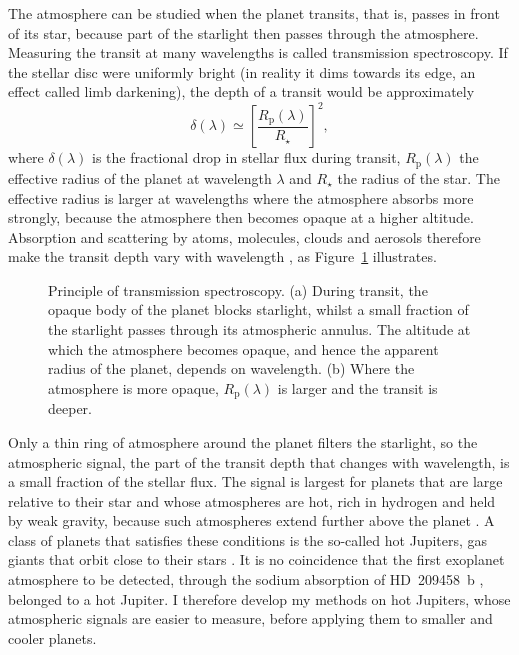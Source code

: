 The atmosphere can be studied when the planet transits, that is, passes in front of its star, because part of the starlight then passes through the atmosphere. Measuring the transit at many wavelengths is called
transmission spectroscopy. If the stellar disc were uniformly bright (in reality it dims towards its edge, an effect called limb darkening), the depth of a transit would be approximately
\begin{equation}
  \delta(\lambda) \simeq
  \left[\frac{R_{\mathrm p}(\lambda)}{R_\star}\right]^2 ,
  \label{eq:transit-depth}
\end{equation}
where $\delta(\lambda)$ is the fractional drop in stellar flux during transit,
$R_{\mathrm p}(\lambda)$ the effective radius of the planet at wavelength
$\lambda$ and $R_\star$ the radius of the star. The effective radius is larger
at wavelengths where the atmosphere absorbs more strongly, because the
atmosphere then becomes opaque at a higher altitude. Absorption and scattering by atoms, molecules, clouds and aerosols therefore make the transit depth vary with
wavelength \citep{SeagerSasselov2000,Brown2001}, as
Figure~\ref{fig:transmission-spectroscopy} illustrates.

\begin{figure}[t]
  \centering
  
  \caption{Principle of transmission spectroscopy. (a) During transit, the
  opaque body of the planet blocks starlight, whilst a small fraction of the
  starlight passes through its atmospheric annulus. The altitude at which
  the atmosphere becomes opaque, and hence the apparent radius of the
  planet, depends on wavelength. (b) Where the atmosphere is more opaque,
  $R_{\mathrm p}(\lambda)$ is larger and the transit is deeper.}
  \label{fig:transmission-spectroscopy}
\end{figure}

Only a thin ring of atmosphere around the planet filters the starlight, so the atmospheric signal, the part of the transit depth that changes with wavelength, is a small fraction of the stellar flux. The signal is
largest for planets that are large relative to their star and whose
atmospheres are hot, rich in hydrogen and held by weak gravity, because such
atmospheres extend further above the planet
\citep{SeagerSasselov2000,Brown2001}. A class of planets that satisfies these
conditions is the so-called hot Jupiters, gas giants that orbit close to their
stars \citep{Brown2001,Madhusudhan2019}. It is no coincidence that the first
exoplanet atmosphere to be detected, through the sodium absorption of
HD~209458~b \citep{CharbonneauEtAl2002}, belonged to a hot Jupiter. I therefore develop my methods on hot Jupiters, whose atmospheric signals are easier to measure, before applying them to smaller and cooler planets.

